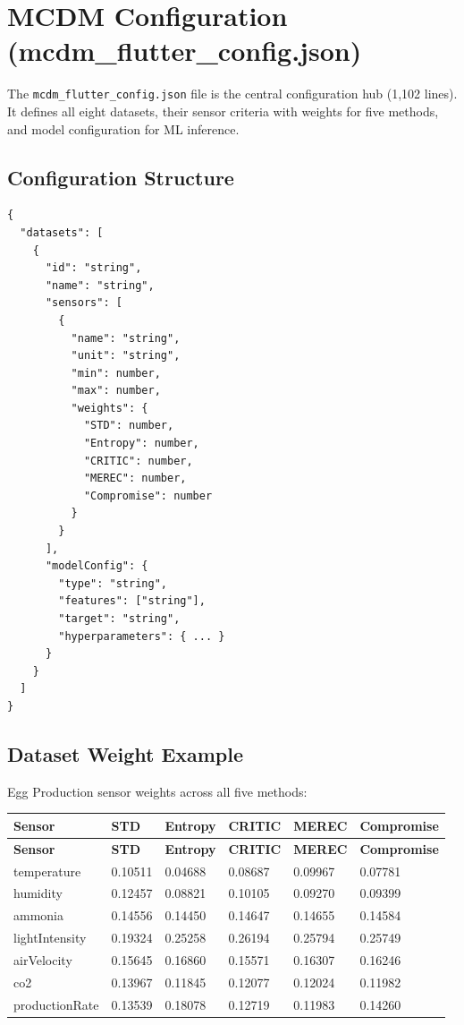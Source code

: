 \documentclass[12pt,a4paper,oneside]{report}
\begin{document}
\chapter{MCDM Configuration (mcdm\_flutter\_config.json)}
\label{ch:mcdm_config}

The \texttt{mcdm\_flutter\_config.json} file is the central configuration hub (1,102 lines). It defines all eight datasets, their sensor criteria with weights for five methods, and model configuration for ML inference.

\section{Configuration Structure}

\begin{lstlisting}[style=jsonstyle]
{
  "datasets": [
    {
      "id": "string",
      "name": "string",
      "sensors": [
        {
          "name": "string",
          "unit": "string",
          "min": number,
          "max": number,
          "weights": {
            "STD": number,
            "Entropy": number,
            "CRITIC": number,
            "MEREC": number,
            "Compromise": number
          }
        }
      ],
      "modelConfig": {
        "type": "string",
        "features": ["string"],
        "target": "string",
        "hyperparameters": { ... }
      }
    }
  ]
}
\end{lstlisting}

\section{Dataset Weight Example}

Egg Production sensor weights across all five methods:

\begin{longtable}{p{3cm} p{1.8cm} p{1.8cm} p{1.8cm} p{1.8cm} p{1.8cm}}
\toprule
\textbf{Sensor} & \textbf{STD} & \textbf{Entropy} & \textbf{CRITIC} & \textbf{MEREC} & \textbf{Compromise} \\
\midrule
\endfirsthead
\toprule
\textbf{Sensor} & \textbf{STD} & \textbf{Entropy} & \textbf{CRITIC} & \textbf{MEREC} & \textbf{Compromise} \\
\midrule
\endhead
\bottomrule
\endfoot
temperature & 0.10511 & 0.04688 & 0.08687 & 0.09967 & 0.07781 \\
humidity & 0.12457 & 0.08821 & 0.10105 & 0.09270 & 0.09399 \\
ammonia & 0.14556 & 0.14450 & 0.14647 & 0.14655 & 0.14584 \\
lightIntensity & 0.19324 & 0.25258 & 0.26194 & 0.25794 & 0.25749 \\
airVelocity & 0.15645 & 0.16860 & 0.15571 & 0.16307 & 0.16246 \\
co2 & 0.13967 & 0.11845 & 0.12077 & 0.12024 & 0.11982 \\
productionRate & 0.13539 & 0.18078 & 0.12719 & 0.11983 & 0.14260 \\
\bottomrule
\end{longtable}
\end{document}
